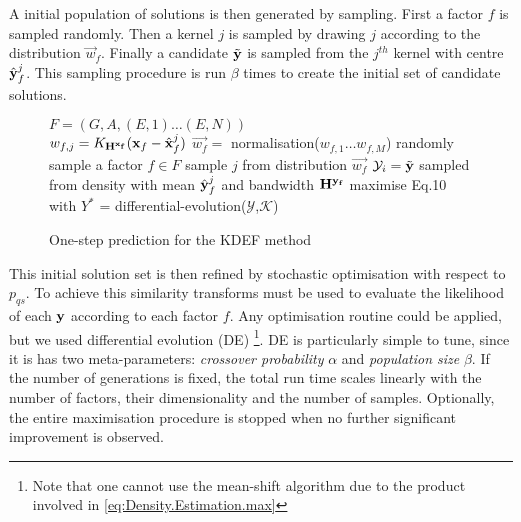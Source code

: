 A initial population of solutions is then generated by sampling. First a factor $f$ is sampled randomly. Then a kernel $j$ is sampled by drawing $j$ according to the distribution $\vec{w}_f$. Finally a candidate $\tilde{\mathbf{y}}$ is sampled from the $j^{th}$ kernel with centre $\hat{\mathbf{y}}^j_f$. This sampling procedure is run $\beta$ times to create the initial set of candidate solutions.
\begin{figure}
\begin{algorithmic}
\STATE $F = (G, A, (E,1) \ldots (E,N))$  \\
\STATE $w_{f,j} = K_{\mathbf{H^{\mathbf{x}_f}}}(\mathbf{x}_f - \hat{\mathbf{x}}_f^j)$
\ENDFOR
\STATE $\vec{w_f} =$ normalisation($w_{f,1} \ldots w_{f,M}$)
\ENDFOR
{}
\STATE randomly sample a factor $f\in F$ 
\STATE sample $j$ from distribution $\vec{w_f}$
\STATE  $\mathcal{Y}_i = \tilde{\mathbf{y}}$ sampled from density with mean $\hat{\mathbf{y}}^j_f$ and bandwidth $\mathbf{H^{\mathbf{y}_f}}$
\ENDFOR
\STATE maximise Eq.10 with $Y^*$ = differential-evolution($\mathcal{Y}$,$\mathcal{K}$) 
\end{algorithmic}
\caption{\label{alg:prediction}One-step prediction for the KDEF method}
\end{figure}

This initial solution set is then refined by stochastic optimisation with respect to $p_{qs}$. To achieve this similarity transforms must be used to evaluate the likelihood of each $\mathbf{y}$ according to each factor $f$. Any optimisation routine could be applied, but we used differential evolution (DE) \cite{storn_differential_1997}\footnote{Note that one cannot use the mean-shift algorithm \cite{cheng_mean_1995}
due to the product involved in \eqref{eq:Density.Estimation.max}}.
DE is particularly simple to tune, since it is has two meta-parameters: \textit{crossover probability} $\alpha$ and \textit{population size} $\beta$. If the number of generations is fixed, the total run time scales linearly with the number of factors, their dimensionality and the number of samples. Optionally, the entire maximisation procedure is stopped when no further significant improvement is observed. 

%
%

